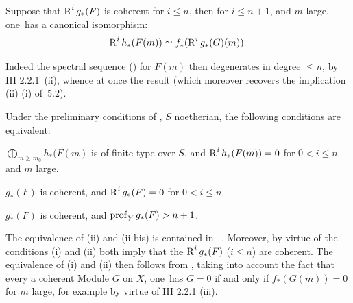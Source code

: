 \begin{corollary} \label{XII.5.4}
Suppose that $\operatorname{R}^ig_\ast(F)$ is coherent for $i\leq n$, then for $i\leq n+1$, and $m$ large, one~has a canonical isomorphism:
\[
\operatorname{R}^ih_\ast(F(m)) \simeq f_\ast(\operatorname{R}^ig_\ast(G)(m)).
\]
\end{corollary}

Indeed the spectral sequence () for $F(m)$ then degenerates in degree $\leq n$, by \EGA III 2.2.1~(ii), whence at once the result (which moreover recovers the implication (ii) \ALORS (i) of~5.2).

%
\begin{corollary} \label{XII.5.5}
Under the preliminary conditions of , $S$ noetherian, the following conditions are equivalent:
\begin{enumeratei}
\item
$\bigoplus_{m\geq m_0}h_\ast(F(m)$ is of finite type over $S$, and $\operatorname{R}^ih_\ast(F(m))=0$ for $0<i\leq n$ and $m$ large.
\item
$g_\ast(F)$ is coherent, and $\operatorname{R}^ig_\ast(F)=0$ for $0<i\leq n$.
\item[\textup{(ii bis)}] $g_\ast(F)$ is coherent, and $\operatorname{prof}_Y g_\ast(F)>n+1$.
\end{enumeratei}
\end{corollary}

The equivalence of (ii) and (ii bis) is contained in ~. Moreover, by virtue of  the conditions (i) and (ii) both imply that the $\operatorname{R}^ig_\ast(F)$ ($i\leq n$) are coherent. The equivalence of (i) and (ii) then follows from , taking into account the fact that every a coherent Module $G$ on $X$, one~has $G=0$ if and only if $f_\ast(G(m))=0$ for $m$ large, for example by virtue of \EGA III 2.2.1 (iii).

